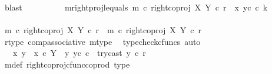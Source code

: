 \begin{isabellebody}
\ blast\isanewline
\ \ \ \ \ \ \ \ \isamarkupfalse%
\ m{\isacharunderscore}{\kern0pt}rightproj{\isacharunderscore}{\kern0pt}l{\isacharunderscore}{\kern0pt}equals{\isacharcolon}{\kern0pt}\ {\isachardoublequoteopen}m\ {\isasymcirc}\isactrlsub c\ right{\isacharunderscore}{\kern0pt}coproj\ X\ Y\ {\isasymcirc}\isactrlsub c\ r\ {\isacharequal}{\kern0pt}\ {\isasymlangle}x{}{\isacharcomma}{\kern0pt}\ y{}\isactrlsup c\ {\isasymcirc}\isactrlsub c\ k{\isasymrangle}{\isachardoublequoteclose}\isanewline
\ \ \ \ \ \ \ \ \ \ \ \ \ \isanewline
\ \ \ \ \ \ \ \ \isamarkupfalse%
\ {\isacharminus}{\kern0pt}\isanewline
\ \ \ \ \ \ \ \ \ \ \isamarkupfalse%
\ {\isachardoublequoteopen}m\ {\isasymcirc}\isactrlsub c\ right{\isacharunderscore}{\kern0pt}coproj\ X\ Y\ {\isasymcirc}\isactrlsub c\ r\ {\isacharequal}{\kern0pt}\ {\isacharparenleft}{\kern0pt}m\ {\isasymcirc}\isactrlsub c\ right{\isacharunderscore}{\kern0pt}coproj\ X\ Y{\isacharparenright}{\kern0pt}\ {\isasymcirc}\isactrlsub c\ r{\isachardoublequoteclose}\isanewline
\ \ \ \ \ \ \ \ \ \ \ \ \isamarkupfalse%
\ r{\isacharunderscore}{\kern0pt}type\ comp{\isacharunderscore}{\kern0pt}associative{}\ m{\isacharunderscore}{\kern0pt}type\ \isamarkupfalse%
\ {\isacharparenleft}{\kern0pt}typecheck{\isacharunderscore}{\kern0pt}cfuncs{\isacharcomma}{\kern0pt}\ auto{\isacharparenright}{\kern0pt}\isanewline
\ \ \ \ \ \ \ \ \ \ \isamarkupfalse%
\ \isamarkupfalse%
\ {\isachardoublequoteopen}{\isachardot}{\kern0pt}{\isachardot}{\kern0pt}{\isachardot}{\kern0pt}\ {\isacharequal}{\kern0pt}\ {\isacharparenleft}{\kern0pt}{\isacharparenleft}{\kern0pt}{\isasymlangle}x{}{\isacharcomma}{\kern0pt}\ y{}{\isasymrangle}\ {\isasymamalg}\ {\isasymlangle}x{}\ {\isasymcirc}\isactrlsub c\ {\isasymbeta}\isactrlbsub Y\ {\isasymsetminus}\ {\isacharparenleft}{\kern0pt}{\isasymone}{\isacharcomma}{\kern0pt}y{}{\isacharparenright}{\kern0pt}\isactrlesub {\isacharcomma}{\kern0pt}\ y{}\isactrlsup c{\isasymrangle}{\isacharparenright}{\kern0pt}\ {\isasymcirc}\isactrlsub c\ \ try{\isacharunderscore}{\kern0pt}cast\ y{}{\isacharparenright}{\kern0pt}\ {\isasymcirc}\isactrlsub c\ r{\isachardoublequoteclose}\isanewline
\ \ \ \ \ \ \ \ \ \ \ \ \isamarkupfalse%
\ m{\isacharunderscore}{\kern0pt}def\ right{\isacharunderscore}{\kern0pt}coproj{\isacharunderscore}{\kern0pt}cfunc{\isacharunderscore}{\kern0pt}coprod\ type{}\ \isamarkupfalse%

\end{isabellebody}
